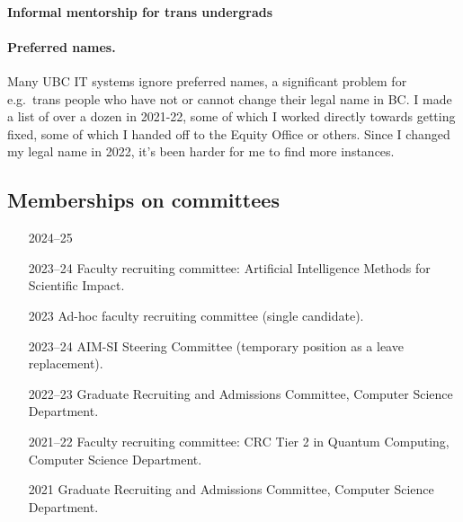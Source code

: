 \documentclass[10pt]{article}
\begin{document}


\paragraph{Informal mentorship for trans undergrads}

\paragraph{Preferred names.}
{%
Many UBC IT systems ignore preferred names,
a significant problem for e.g.\ trans people who have not or cannot change their legal name in BC.
I made a list of over a dozen in 2021-22,
some of which I worked directly towards getting fixed,
some of which I handed off to the Equity Office or others.
Since I changed my legal name in 2022, it's been harder for me to find more instances.
}


\subsection{Memberships on committees} %

\begin{itemize}[leftmargin=5em]
  \item[2024--25] 
  \item[2023--24] {Faculty recruiting committee: Artificial Intelligence Methods for Scientific Impact.}
  \item[2023] {Ad-hoc faculty recruiting committee (single candidate).}
  \item[2023--24] {AIM-SI Steering Committee (temporary position as a leave replacement).}
  \item[2022--23] Graduate Recruiting and Admissions Committee, Computer Science Department.
  \item[2021--22] Faculty recruiting committee: CRC Tier 2 in Quantum Computing, Computer Science Department.
  \item[2021] Graduate Recruiting and Admissions Committee, Computer Science Department.
\end{itemize}
\end{document}
